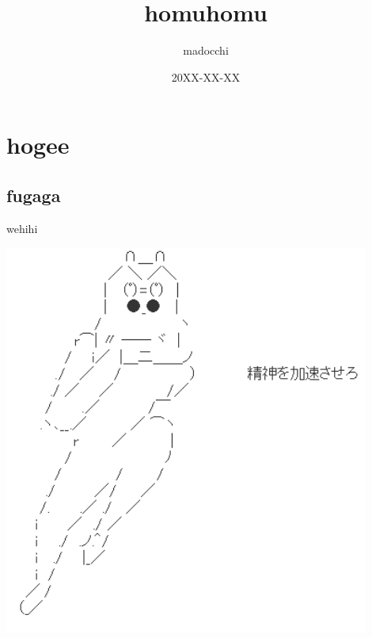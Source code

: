 \documentclass[10.5pt,a4paper]{article}
\title{homuhomu}
\author{madocchi}
\date{20XX-XX-XX}
\begin{document}
\maketitle{}
\section{hogee}
\subsection{fugaga}
wehihi\cite{hoge}

\begin{center}
    \includegraphics[width=12cm]{images/kasoku.png}
\end{center}


\end{document}
